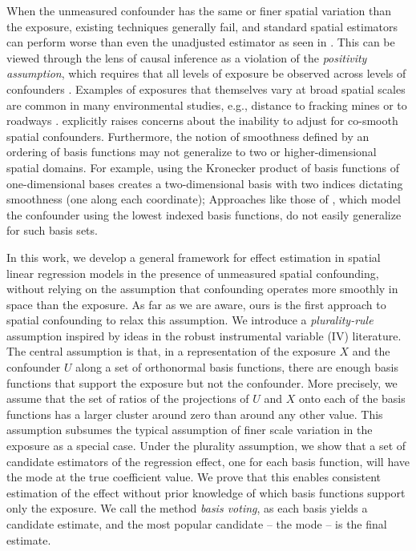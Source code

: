 \documentclass[
  12pt]{article}
\begin{document}
When the unmeasured confounder has the same or finer spatial variation than the exposure, existing techniques generally fail, and standard spatial estimators can perform worse than even the unadjusted estimator as seen in \cite{paciorek2010importance,khan2023re}. This can be viewed through the lens of causal inference as a violation of the \textit{positivity assumption}, which requires that all levels of exposure be observed across levels of confounders \citep{schnell2020mitigating}.  
Examples of exposures that themselves vary at broad spatial scales are common in many environmental studies, e.g., distance to fracking mines \citep{casey2016unconventional,currie2017hydraulic} or to roadways \citep{karner2010near}. \cite{brugge2013highway} explicitly raises concerns about the inability to adjust for co-smooth spatial confounders. Furthermore, the notion of smoothness defined by an ordering of basis functions may not generalize to two or higher-dimensional spatial domains. For example, using the Kronecker product of basis functions of one-dimensional bases creates a two-dimensional basis with two indices dictating smoothness (one along each coordinate);  Approaches like those of \cite{keller2020selecting}, which model the confounder using the lowest indexed basis functions, do not easily generalize for such basis sets. 

In this work, we develop a general framework for effect estimation in spatial linear regression models in the presence of unmeasured spatial confounding, without relying on the assumption that confounding operates more smoothly in space than the exposure. As far as we are aware, ours is the first approach to spatial confounding to relax this assumption. We introduce a  \textit{plurality-rule} assumption inspired by ideas in the robust instrumental variable (IV) literature. The central assumption is that, in a representation of the exposure $X$ and the confounder $U$ along a set of orthonormal basis functions, there are enough basis functions that support the exposure but not the confounder. More precisely, we assume that the set of ratios of the projections of $U$ and $X$ onto each of the basis functions has a larger cluster around zero than around any other value. This assumption subsumes the typical assumption of finer scale variation in the  exposure as a special case. Under the plurality assumption, we show that a set of candidate estimators of the regression effect, one for each basis function, will have the mode at the true coefficient value. We prove that this enables consistent estimation of the effect without prior knowledge of which basis functions support only the exposure. We call the method {\em basis voting}, as each basis yields a candidate estimate, and the most popular candidate -- the mode -- is the final estimate. 
\end{document}
